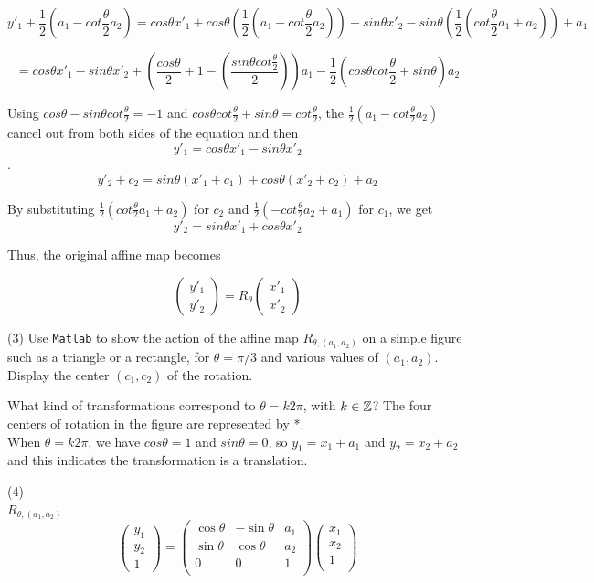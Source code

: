 \documentclass[12pt]{article}
\begin{document}
\[y'_1 + \frac{1}{2}(a_1 - cot\frac{\theta}{2} a_2) =  cos\theta x'_1 + cos\theta (\frac{1}{2}(a_1 - cot \frac{\theta}{2} a_2)) - sin\theta x'_2 - sin\theta (\frac{1}{2} (cot \frac{\theta}{2}a_1 + a_2)) + a_1 \]

$$ = cos\theta x'_1  - sin\theta x'_2 + (\frac {cos\theta}{2} + 1 - (\frac{sin\theta cot \frac{\theta}{2}}{2} ))a_1 - \frac{1}{2}(cos\theta cot \frac{\theta}{2} + sin\theta) a_2$$

Using $cos\theta - sin\theta cot \frac{\theta}{2} = -1$ and $cos\theta cot \frac{\theta}{2} + sin\theta = cot \frac{\theta}{2}$, the $\frac{1}{2} (a_1 - cot \frac{\theta}{2}a_2)$ cancel out from both sides of the equation and then $$y'_1 = cos\theta x'_1 - sin\theta x'_2$$.
$$y'_2 + c_2 = sin\theta (x'_1+ c_1) + cos\theta (x'_2 +c_2) + a_2$$

By substituting $\frac{1}{2} \left( cot \frac{\theta}{2} a_1+a_2 \right)$ for $c_2$ and $\frac{1}{2} \left( -cot \frac{\theta}{2} a_2+a_1 \right)$ for $c_1$, we get\\ 

 $$y'_2 = sin\theta x'_1 + cos\theta x'_2$$
 
 Thus, the original affine map becomes 
 
 $$ \begin{pmatrix}y'_1 \\y'_2\end{pmatrix}= R_\theta \begin{pmatrix}x'_1 \\x'_2\end{pmatrix}$$

\medskip
(3)
Use {\tt Matlab} to show the action of  the affine map
$R_{\theta, (a_1,a_2)}$ on a simple figure such as
a triangle or a rectangle,
for $\theta = \pi/3$ and various values of $(a_1, a_2)$.
Display the center $(c_1, c_2)$ of the rotation.

\medskip
What kind of transformations correspond to
$\theta= k 2\pi$, with $k \in \mathbb{Z}$?
The four centers of rotation in the figure are represented by *.\\
When $\theta = k2\pi$, we have $cos\theta=1$ and $sin\theta=0$, 
so $y_1 = x_1 + a_1$ and $y_2=x_2 + a_2$ and this indicates the transformation is a translation.

\medskip
(4) \\

$R_{\theta, (a_1,a_2)}$ \\
\[
\begin{pmatrix}
y_1 \\
y_2 \\
1
\end{pmatrix}
=
\begin{pmatrix}
\cos\theta & -\sin\theta & a_1 \\
\sin\theta & \cos\theta & a_2 \\
0 & 0 & 1 \\
\end{pmatrix}
\begin{pmatrix}
x_1 \\
x_2 \\
1 \\
\end{pmatrix}
\]
\end{document}
